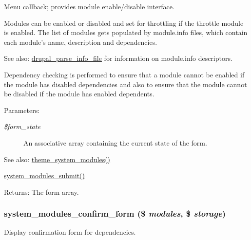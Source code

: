 Menu callback; provides module enable/disable interface.

Modules can be enabled or disabled and set for throttling if the throttle module is enabled. The list of modules gets populated by module.info files, which contain each module's name, description and dependencies. \begin{Desc}
\item[See also:]\hyperlink{common_8inc_277955232059631211fcfde533ea89d6}{drupal\_\-parse\_\-info\_\-file} for information on module.info descriptors.\end{Desc}
Dependency checking is performed to ensure that a module cannot be enabled if the module has disabled dependencies and also to ensure that the module cannot be disabled if the module has enabled dependents.

\begin{Desc}
\item[Parameters:]
\begin{description}
\item[{\em \$form\_\-state}]An associative array containing the current state of the form.\end{description}
\end{Desc}
\begin{Desc}
\item[See also:]\hyperlink{group__themeable_gdb0103cb92abf4193ad367528d1d060a}{theme\_\-system\_\-modules()} 

\hyperlink{system_8admin_8inc_b5e3e0148d76ec1bfe7e441d4ff56146}{system\_\-modules\_\-submit()} \end{Desc}
\begin{Desc}
\item[Returns:]The form array. \end{Desc}
\hypertarget{group__forms_g253f61674ab19c32b0df811c365ae00c}{
\subsubsection[{system\_\-modules\_\-confirm\_\-form}]{\setlength{\rightskip}{0pt plus 5cm}system\_\-modules\_\-confirm\_\-form (\$ {\em modules}, \/  \$ {\em storage})}}
\label{group__forms_g253f61674ab19c32b0df811c365ae00c}


Display confirmation form for dependencies.

